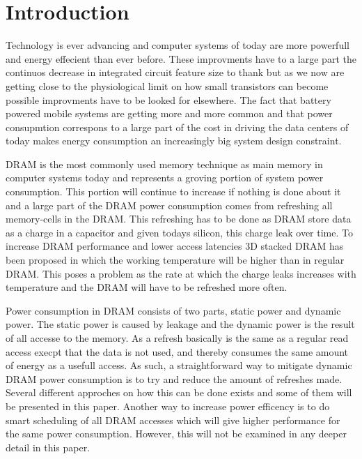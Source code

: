 \section{Introduction}
\label{sec:int}
Technology is ever advancing and computer systems of today are more powerfull and energy effecient than ever before. These improvments have to a large part the continuos decrease in integrated circuit feature size to thank but as we now are getting close to the physiological limit on how small transistors can become possible improvments have to be looked for elsewhere. The fact that battery powered mobile systems are getting more and more common and that power consupmtion correspons to a large part of the cost in driving the data centers of today makes energy consumption an increasingly big system design constraint.

DRAM is the most commonly used memory technique as main memory in computer systems today and represents a groving portion of system power consumption. This portion will continue to increase if nothing is done about it and a large part of the DRAM power consumption comes from refreshing all memory-cells in the DRAM. This refreshing has to be done as DRAM store data as a charge in a capacitor and given todays silicon, this charge leak over time. To increase DRAM performance and lower access latencies 3D stacked DRAM has been proposed in which the working temperature will be higher than in regular DRAM. This poses a problem as the rate at which the charge leaks increases with temperature and the DRAM will have to be refreshed more often.   

Power consumption in DRAM consists of two parts, static power and dynamic power. The static power is caused by leakage and the dynamic power is the result of all accesse to the memory. As a refresh basically is the same as a regular read access execpt that the data is not used, and thereby consumes the same amount of energy as a usefull access. As such, a straightforward way to mitigate dynamic DRAM power consumption is to try and reduce the amount of refreshes made. Several different approches on how this can be done exists and some of them will be presented in this paper. Another way to increase power efficency is to do smart scheduling of all DRAM accesses which will give higher performance for the same power consumption. However, this will not be examined in any deeper detail in this paper.  
